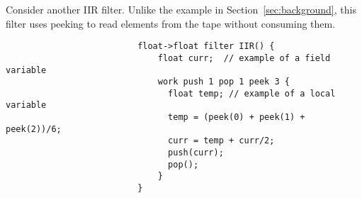 Consider another IIR filter.  Unlike the example in
Section~\ref{sec:background}, this filter uses peeking to read
elements from the tape without consuming them.
\begin{singlespace}
\vspace{-16pt}
\scriptsize
\begin{verbatim}
                          float->float filter IIR() {
                              float curr;  // example of a field variable
                              work push 1 pop 1 peek 3 {
                                float temp; // example of a local variable
                                temp = (peek(0) + peek(1) + peek(2))/6;
                                curr = temp + curr/2;
                                push(curr);
                                pop();
                              }
                          }                         
\end{verbatim}
\end{singlespace}
\vspace{-16pt}

